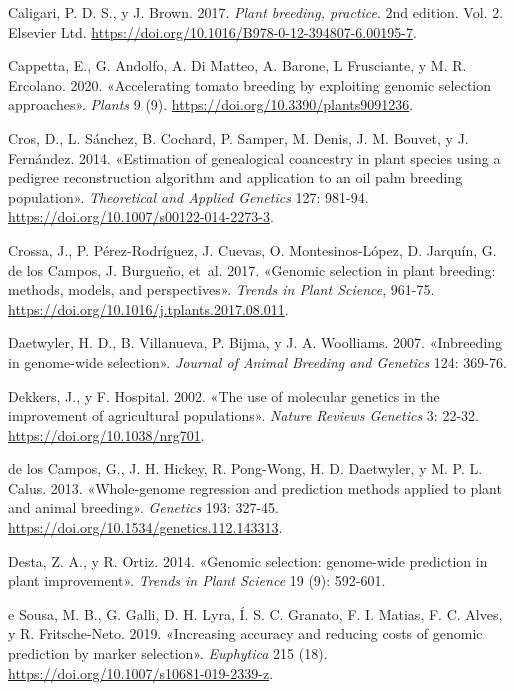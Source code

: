 \documentclass[11pt,spanish,a4paper,oneside,]{book} %
\begin{document}
\leavevmode\hypertarget{ref-cite:42}{}%
Caligari, P. D. S., y J. Brown. 2017. \emph{Plant breeding, practice}. 2nd edition. Vol. 2. Elsevier Ltd. \url{https://doi.org/10.1016/B978-0-12-394807-6.00195-7}.

\leavevmode\hypertarget{ref-cite:64}{}%
Cappetta, E., G. Andolfo, A. Di Matteo, A. Barone, L Frusciante, y M. R. Ercolano. 2020. «Accelerating tomato breeding by exploiting genomic selection approaches». \emph{Plants} 9 (9). \url{https://doi.org/10.3390/plants9091236}.

\leavevmode\hypertarget{ref-cite:48}{}%
Cros, D., L. Sánchez, B. Cochard, P. Samper, M. Denis, J. M. Bouvet, y J. Fernández. 2014. «Estimation of genealogical coancestry in plant species using a pedigree reconstruction algorithm and application to an oil palm breeding population». \emph{Theoretical and Applied Genetics} 127: 981-94. \url{https://doi.org/10.1007/s00122-014-2273-3}.

\leavevmode\hypertarget{ref-cite:37}{}%
Crossa, J., P. Pérez-Rodríguez, J. Cuevas, O. Montesinos-López, D. Jarquín, G. de los Campos, J. Burgueño, et~al. 2017. «Genomic selection in plant breeding: methods, models, and perspectives». \emph{Trends in Plant Science}, 961-75. \url{https://doi.org/10.1016/j.tplants.2017.08.011}.

\leavevmode\hypertarget{ref-cite:40}{}%
Daetwyler, H. D., B. Villanueva, P. Bijma, y J. A. Woolliams. 2007. «Inbreeding in genome-wide selection». \emph{Journal of Animal Breeding and Genetics} 124: 369-76.

\leavevmode\hypertarget{ref-cite:59}{}%
Dekkers, J., y F. Hospital. 2002. «The use of molecular genetics in the improvement of agricultural populations». \emph{Nature Reviews Genetics} 3: 22-32. \url{https://doi.org/10.1038/nrg701}.

\leavevmode\hypertarget{ref-cite:31}{}%
de los Campos, G., J. H. Hickey, R. Pong-Wong, H. D. Daetwyler, y M. P. L. Calus. 2013. «Whole-genome regression and prediction methods applied to plant and animal breeding». \emph{Genetics} 193: 327-45. \url{https://doi.org/10.1534/genetics.112.143313}.

\leavevmode\hypertarget{ref-cite:10}{}%
Desta, Z. A., y R. Ortiz. 2014. «Genomic selection: genome-wide prediction in plant improvement». \emph{Trends in Plant Science} 19 (9): 592-601.

\leavevmode\hypertarget{ref-cite:84}{}%
e Sousa, M. B., G. Galli, D. H. Lyra, Í. S. C. Granato, F. I. Matias, F. C. Alves, y R. Fritsche-Neto. 2019. «Increasing accuracy and reducing costs of genomic prediction by marker selection». \emph{Euphytica} 215 (18). \url{https://doi.org/10.1007/s10681-019-2339-z}.
\end{document}
